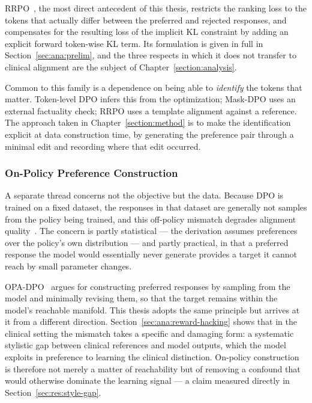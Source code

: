 RRPO~\cite{sarkar2025self}, the most direct antecedent of this thesis, restricts the ranking loss to the tokens that actually differ between the preferred and rejected responses, and compensates for the resulting loss of the implicit KL constraint by adding an explicit forward token-wise KL term. Its formulation is given in full in Section~\ref{sec:ana:prelim}, and the three respects in which it does not transfer to clinical alignment are the subject of Chapter~\ref{section:analysis}.

Common to this family is a dependence on being able to \emph{identify} the tokens that matter. Token-level DPO infers this from the optimization; Mask-DPO uses an external factuality check; RRPO uses a template alignment against a reference. The approach taken in Chapter~\ref{section:method} is to make the identification explicit at data construction time, by generating the preference pair through a minimal edit and recording where that edit occurred.

\subsubsection{On-Policy Preference Construction}

A separate thread concerns not the objective but the data. Because DPO is trained on a fixed dataset, the responses in that dataset are generally not samples from the policy being trained, and this off-policy mismatch degrades alignment quality~\cite{yang2025mitigating}. The concern is partly statistical --- the derivation assumes preferences over the policy's own distribution --- and partly practical, in that a preferred response the model would essentially never generate provides a target it cannot reach by small parameter changes.

OPA-DPO~\cite{yang2025opadpo} argues for constructing preferred responses by sampling from the model and minimally revising them, so that the target remains within the model's reachable manifold. This thesis adopts the same principle but arrives at it from a different direction. Section~\ref{sec:ana:reward-hacking} shows that in the clinical setting the mismatch takes a specific and damaging form: a systematic stylistic gap between clinical references and model outputs, which the model exploits in preference to learning the clinical distinction. On-policy construction is therefore not merely a matter of reachability but of removing a confound that would otherwise dominate the learning signal --- a claim measured directly in Section~\ref{sec:res:style-gap}.

